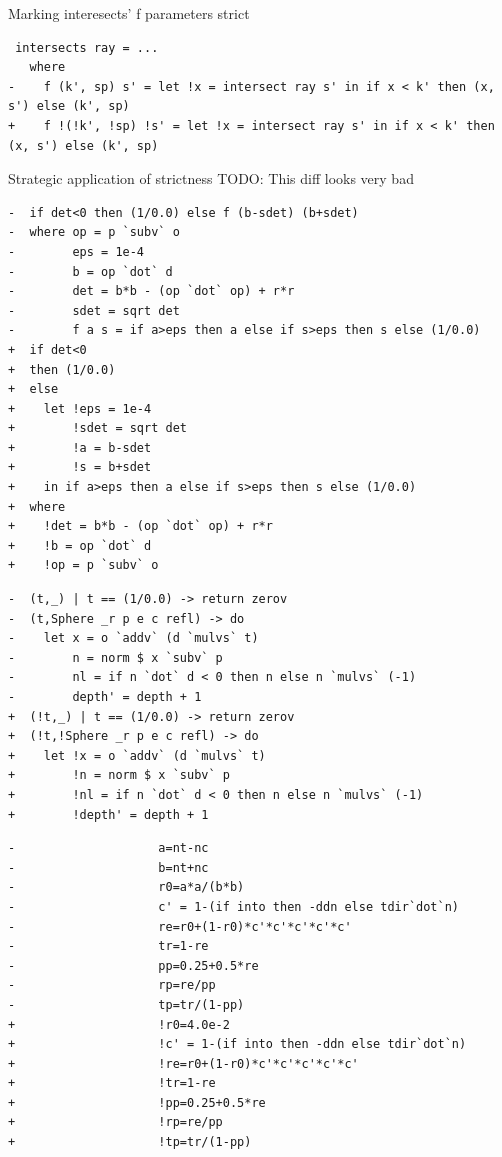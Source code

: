 \documentclass[8pt]{beamer}
\begin{document}
\begin{frame}[fragile]{Marking interesects' f parameters strict}
\begin{verbatim}
 intersects ray = ...
   where
-    f (k', sp) s' = let !x = intersect ray s' in if x < k' then (x, s') else (k', sp)
+    f !(!k', !sp) !s' = let !x = intersect ray s' in if x < k' then (x, s') else (k', sp)
\end{verbatim}
\end{frame}


\begin{frame}[fragile]{Strategic application of strictness}
TODO: This diff looks very bad
\begin{verbatim}
-  if det<0 then (1/0.0) else f (b-sdet) (b+sdet)
-  where op = p `subv` o
-        eps = 1e-4
-        b = op `dot` d
-        det = b*b - (op `dot` op) + r*r
-        sdet = sqrt det
-        f a s = if a>eps then a else if s>eps then s else (1/0.0)
+  if det<0
+  then (1/0.0)
+  else
+    let !eps = 1e-4
+        !sdet = sqrt det
+        !a = b-sdet
+        !s = b+sdet
+    in if a>eps then a else if s>eps then s else (1/0.0)
+  where
+    !det = b*b - (op `dot` op) + r*r
+    !b = op `dot` d
+    !op = p `subv` o
\end{verbatim}

\begin{verbatim}
-  (t,_) | t == (1/0.0) -> return zerov
-  (t,Sphere _r p e c refl) -> do
-    let x = o `addv` (d `mulvs` t)
-        n = norm $ x `subv` p
-        nl = if n `dot` d < 0 then n else n `mulvs` (-1)
-        depth' = depth + 1
+  (!t,_) | t == (1/0.0) -> return zerov
+  (!t,!Sphere _r p e c refl) -> do
+    let !x = o `addv` (d `mulvs` t)
+        !n = norm $ x `subv` p
+        !nl = if n `dot` d < 0 then n else n `mulvs` (-1)
+        !depth' = depth + 1
\end{verbatim}
\begin{verbatim}
-                    a=nt-nc
-                    b=nt+nc
-                    r0=a*a/(b*b)
-                    c' = 1-(if into then -ddn else tdir`dot`n)
-                    re=r0+(1-r0)*c'*c'*c'*c'*c'
-                    tr=1-re
-                    pp=0.25+0.5*re
-                    rp=re/pp
-                    tp=tr/(1-pp)
+                    !r0=4.0e-2
+                    !c' = 1-(if into then -ddn else tdir`dot`n)
+                    !re=r0+(1-r0)*c'*c'*c'*c'*c'
+                    !tr=1-re
+                    !pp=0.25+0.5*re
+                    !rp=re/pp
+                    !tp=tr/(1-pp)
\end{verbatim}
\end{frame}
\end{document}

